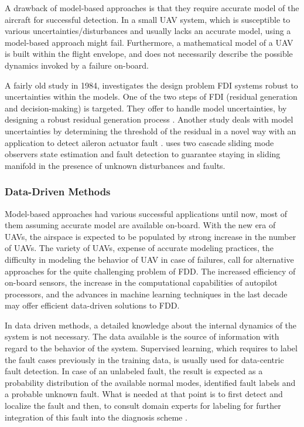 A drawback of model-based approaches is that they require accurate model of the 
aircraft for successful detection. In a small UAV system, which is susceptible to various 
uncertainties/disturbances and usually lacks an accurate model, using a model-based approach might fail. 
Furthermore, a mathematical model of a UAV 
is built within the flight envelope, and does not necessarily describe the 
possible dynamics invoked by a failure on-board. 

A fairly old study in 1984, investigates the design problem FDI systems robust to 
uncertainties within the models. One of the two steps of FDI (residual generation and decision-making) is targeted. They offer to handle model 
uncertainties, by designing a robust residual generation process \cite{chow1984analytical}. 
Another study deals with model uncertainties by determining the threshold of the residual 
in a novel way with an application to detect aileron actuator fault \cite{rotstein2006fault}. 
\cite{sharma2007fault} uses two cascade sliding mode observers state estimation and 
fault detection to guarantee staying in sliding manifold in the presence of unknown 
disturbances and faults. 
%

\subsubsection{Data-Driven Methods}

Model-based approaches had various successful applications until now, 
most of them assuming accurate model are available on-board. With the new 
era of UAVs, the airspace is expected to be populated by strong increase 
in the number of UAVs. The variety of UAVs, expense of accurate modeling 
practices, the difficulty in modeling the behavior of UAV in case of failures, 
call for alternative approaches for the quite challenging problem of FDD. 
The increased efficiency of on-board sensors, the increase in the computational 
capabilities of autopilot processors, and the advances in machine learning 
techniques in the last decade may offer efficient data-driven solutions to FDD.

In data driven methods, a detailed knowledge about the internal dynamics 
of the system is not necessary. The data available is the source of information 
with regard to the behavior of the system. Supervised learning, which requires 
to label the fault cases previously in the training data, is usually used for 
data-centric fault detection. In case of an unlabeled fault, the result is 
expected as a probability distribution of the available normal modes, identified 
fault labels and a probable unknown fault. What is needed at that point is to 
first detect and localize the fault and then, to consult domain experts for labeling 
for further integration of this fault into the diagnosis scheme \cite{dataCentricDiagOffline}.

